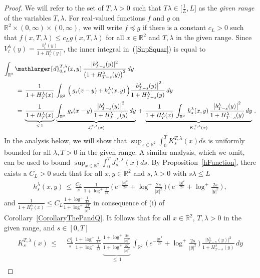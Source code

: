 \documentclass[10pt]{article}
\numberwithin{equation}{section}
\theoremstyle{definition}
\newcommand{\R}{{\mathbb R}}
\begin{document}
\begin{proof} We will refer to the set of $T,\lambda>0$ such that $T\lambda\in \big[\frac{1}{L},L\big] $ as the \textit{given range} of the variables $T,\lambda$.  For real-valued functions $f$ and $g$ on $\R^2\times (0,\infty)\times (0,\infty) $, we will write $f\preceq g$ if there is a constant $c_L>0$ such that $f(x, T,\lambda)\leq c_Lg(x,T,\lambda)$ for all $x\in \R^2$ and $T,\lambda$ in the given range.  Since $V_t^{\lambda}(y)= \frac{  b_{t}^{\lambda}(y)  }{  1+H_{t}^{\lambda}( y)  }$, the inner integral in~(\ref{SupSquar})  is equal to  
\begin{align*}
\int_{\R^2} \, & \mathlarger{d}_{0,s}^{T,\lambda}(x,y)\, \frac{  |b_{T-s}^{\lambda}(y)|^2  }{\big(  1+H_{T-s}^{\lambda}( y)  \big)^2}\, dy \nonumber  \\
&\,=  \,  \frac{1}{1+ H_{T}^{\lambda}(x)}\, \int_{\R^2}  \,\Big(\, g_s(x-y) + h_{s}^{\lambda}(x, y)\, \Big) \frac{\big| b_{T-s}^{\lambda}(y)\big|^2}{1+ H_{T-s}^{\lambda}(y)}\, dy \nonumber \\
&\,=  \,  \underbrace{\frac{1}{1+ H_{T}^{\lambda}(x)} }_{\leq \,1} \,\underbrace{\int_{\R^2} \, g_s(x-y) \,\frac{\big| b_{T-s}^{\lambda}(y)\big|^2}{1+ H_{T-s}^{\lambda}(y)}\, dy}_{ J_s^{T,\lambda}(x)  } \,+ \,  \underbrace{\frac{1}{1+ H_{T}^{\lambda}(x)}\, \int_{\R^2}  \,h_{s}^{\lambda}(x, y)\, \frac{\big| b_{T-s}^{\lambda}(y)\big|^2}{1+ H_{T-s}^{\lambda}(y)}\,dy}_{   K_s^{T,\lambda}(x)   } \,. 
\end{align*}
In the analysis below, we will show that $ \sup_{x\in \R^2} \int_0^T K_s^{T,\lambda}(x)ds  $ is uniformly bounded for all $\lambda,T>0 $ in the given range. A similar analysis, which we omit, can be used to bound $ \sup_{x\in \R^2} \int_0^T J_s^{T,\lambda}(x)ds  $. 
By  Proposition~\ref{hFunction}, there exists a $C_L>0$ such that for all $x,y\in \R^2$ and $s,\lambda>0$ with $s\lambda \leq L$
\begin{align*}
h^{\lambda}_s(x,y)\,\leq \,\frac{  C_L}{s}\,\frac{1}{   1+ \log^+ \frac{1}{s\lambda }  }\,\bigg(\, e^{-\frac{|x|^2}{2s}}+\log^{+}\frac{2s}{|x|^2}  \,\bigg)\,\bigg(\, e^{-\frac{|y|^2}{2s}}+\log^{+}\frac{2s}{|y|^2}\,  \bigg)\,,
\end{align*}
and  $\frac{1}{1+H^{\lambda}_T(x)}  \leq C_L\frac{1+\log^+\frac{1}{T\lambda}    }{1+\log^+ \frac{2T}{|x|^2}   }$ in consequence of (i) of Corollary~\ref{CorollaryThePandQ}.  It follows that for all $x\in \R^2$, $T,\lambda>0$ in the given range,  and $s\in [0,T]$
\begin{align}
  K_s^{T,\lambda}(x)\,\leq \,&\,\frac{C_L^2}{s}\,\frac{   1+ \log^+ \frac{1}{T\lambda }   }{   1+ \log^+ \frac{1}{s\lambda}   } \,\underbrace{\frac{ 1+\log^{+}\frac{2s}{|x|^2}  }{    1+\log^{+}\frac{2T}{|x|^2} }}_{\leq \, 1  }\,\int_{\R^2} \, \bigg(\, e^{-\frac{|y|^2}{2s}}+\log^{+}\frac{2s}{|y|^2} \, \bigg) \,\frac{\big| b_{T-s}^{\lambda}(y)\big|^2}{1+ H_{T-s}^{\lambda}(y)}\,dy \nonumber \\

\end{align}
\end{proof}
\end{document}
